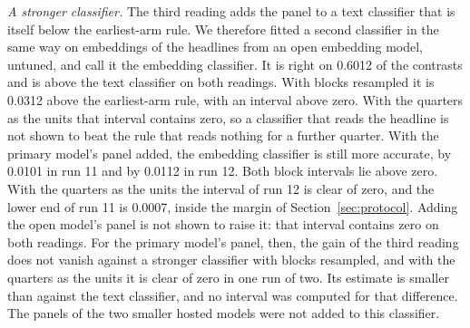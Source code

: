 \emph{A stronger classifier.} The third reading adds the panel to a text classifier that is itself below the earliest-arm rule. We therefore fitted a second classifier in the same way on embeddings of the headlines from an open embedding model, untuned, and call it the embedding classifier. It is right on 0.6012 of the contrasts and is above the text classifier on both readings. With blocks resampled it is 0.0312 above the earliest-arm rule, with an interval above zero. With the quarters as the units that interval contains zero, so a classifier that reads the headline is not shown to beat the rule that reads nothing for a further quarter. With the primary model's panel added, the embedding classifier is still more accurate, by 0.0101 in run 11 and by 0.0112 in run 12. Both block intervals lie above zero. With the quarters as the units the interval of run 12 is clear of zero, and the lower end of run 11 is 0.0007, inside the margin of Section~\ref{sec:protocol}. Adding the open model's panel is not shown to raise it: that interval contains zero on both readings. For the primary model's panel, then, the gain of the third reading does not vanish against a stronger classifier with blocks resampled, and with the quarters as the units it is clear of zero in one run of two. Its estimate is smaller than against the text classifier, and no interval was computed for that difference. The panels of the two smaller hosted models were not added to this classifier.

